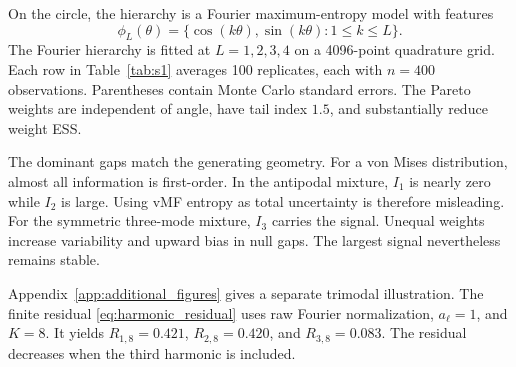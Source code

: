 \documentclass[twoside]{article}
\theoremstyle{definition}
\theoremstyle{remark}
\begin{document}
On the circle, the hierarchy is a Fourier maximum-entropy model with features
\[
  \phi_L(\theta)=\{\cos(k\theta),\sin(k\theta):1\le k\le L\}.
\]
The Fourier hierarchy is fitted at $L=1,2,3,4$ on a 4096-point quadrature grid. Each row in Table~\ref{tab:s1} averages 100 replicates, each with $n=400$ observations. Parentheses contain Monte Carlo standard errors. The Pareto weights are independent of angle, have tail index $1.5$, and substantially reduce weight ESS.


\begin{table}[ht]
\centering
\caption{Fourier information gaps on $S^1$.}
\label{tab:s1}
\scriptsize
{}
\end{table}

The dominant gaps match the generating geometry. For a von Mises distribution, almost all information is first-order. In the antipodal mixture, $I_1$ is nearly zero while $I_2$ is large. Using vMF entropy as total uncertainty is therefore misleading. For the symmetric three-mode mixture, $I_3$ carries the signal. Unequal weights increase variability and upward bias in null gaps. The largest signal nevertheless remains stable.

Appendix~\ref{app:additional_figures} gives a separate trimodal illustration. The finite residual \eqref{eq:harmonic_residual} uses raw Fourier normalization, $a_\ell=1$, and $K=8$. It yields $R_{1,8}=0.421$, $R_{2,8}=0.420$, and $R_{3,8}=0.083$. The residual decreases when the third harmonic is included.
\end{document}
